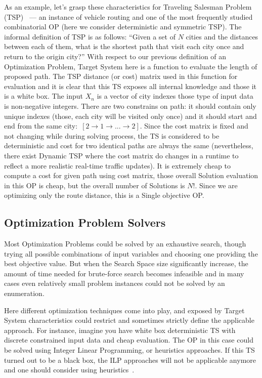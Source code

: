 As an example, let's grasp these characteristics for Traveling Salesman Problem (TSP)~\cite{applegate2006traveling} — an instance of vehicle routing and one of the most frequently studied combinatorial OP (here we consider deterministic and symmetric TSP).
The informal definition of TSP is as follows: ``Given a set of $N$ cities and the distances between each of them, what is the shortest path that visit each city once and return to the origin city?''
With respect to our previous definition of an Optimization Problem, Target System here is a function to evaluate the length of proposed path. The TSP distance (or cost) matrix used in this function for evaluation and it is clear that this TS exposes all internal knowledge and those it is a white box.
The input $X_n$ is a vector of city indexes those type of input data is non-negative integers. There are two constrains on path: it should contain only unique indexes (those, each city will be visited only once) and it should start and end from the same city:~$[2 \rightarrow 1 \rightarrow ... \rightarrow 2]$.
Since the cost matrix is fixed and not changing while during solving process, the TS is considered to be deterministic and cost for two identical paths are always the same (nevertheless, there exist Dynamic TSP where the cost matrix do changes in a runtime to reflect a more realistic real-time traffic updates\cite{cheong2011dynamic}).
It is extremely cheap to compute a cost for given path using cost matrix, those overall Solution evaluation in this OP is cheap, but the overall number of Solutions is $N!$. Since we are optimizing only the route distance, this is a Single objective OP.


\subsection{Optimization Problem Solvers}\label{BG: subsection OP Solvers}
Most Optimization Problems could be solved by an exhaustive search, though trying all possible combinations of input variables and choosing one providing the best objective value. But when the Search Space size significantly increase, the amount of time needed for brute-force search becomes infeasible and in many cases even relatively small problem instances could not be solved by an enumeration.


Here different optimization techniques come into play, and exposed by Target System characteristics could restrict and sometimes strictly define the applicable approach.
For instance, imagine you have white box deterministic TS with discrete constrained input data and cheap evaluation. The OP in this case could be solved using Integer Linear Programming, or heuristics approaches. If this TS turned out to be a black box, the ILP approaches will not be applicable anymore and one should consider using heuristics~\cite{biegler2004retrospective}.

